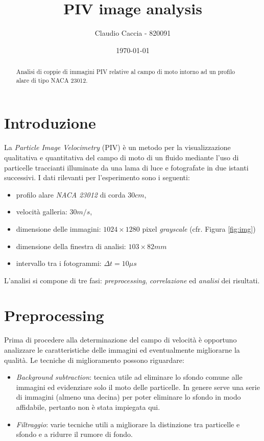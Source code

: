 \documentclass[a4paper]{article}
\title{PIV image analysis}
\author{Claudio Caccia - 820091}
\date{\today}
\begin{document}
\maketitle

\begin{abstract}
Analisi di coppie di immagini PIV relative al campo di moto intorno ad un profilo alare di tipo NACA 23012. 
\end{abstract}

\section{Introduzione}
\label{sec:intro}

La \textit{Particle Image Velocimetry} (PIV) è un metodo per la visualizzazione qualitativa e quantitativa del campo di moto di un fluido mediante l'uso di particelle traccianti illuminate da una lama di luce e fotografate in due istanti successivi. I dati rilevanti per l'esperimento sono i seguenti:
\begin{itemize}
	\item profilo alare \textit{NACA 23012} di corda $30cm$,
	\item velocità galleria: $30m/s$,
	\item dimensione delle immagini: $1024 \times 1280$ pixel \textit{grayscale} (cfr. Figura \ref{fig:img}) 
	\item dimensione della finestra di analisi: $103\times82mm$
	\item intervallo tra i fotogrammi: $\Delta t = 10\mu s$
\end{itemize}

L'analisi si compone di tre fasi: \textit{preprocessing}, \textit{correlazione} ed \textit{analisi} dei risultati.

\section{Preprocessing}

Prima di procedere alla determinazione del campo di velocit\`{a} \`{e} opportuno analizzare le caratteristiche delle immagini ed eventualmente migliorarne la qualit\`{a}. Le tecniche di miglioramento possono riguardare:

\begin{itemize}
	\item \textit{Background subtraction}: tecnica utile ad eliminare lo sfondo comune alle immagini ed evidenziare solo il moto delle particelle. In genere serve una serie di immagini (almeno una decina) per poter eliminare lo sfondo in modo affidabile, pertanto non è stata impiegata qui.
	\item \textit{Filtraggio}:  varie tecniche utili a migliorare la distinzione tra particelle e sfondo e a ridurre il rumore di fondo.
\end{itemize}
\end{document}
